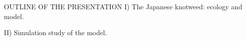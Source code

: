 \documentclass{myBeamer}
\begin{document}
%





\begin{frame}{OUTLINE OF THE PRESENTATION }%
 \bigskip  \bigskip 
I) The Japanese knotweed: ecology and model.   \bigskip


II) Simulation study of the model.
\end{frame}



\end{document}
